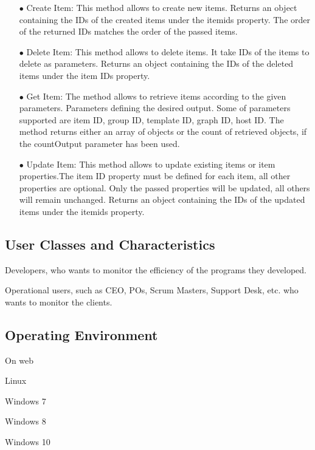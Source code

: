 \documentclass{article}
\begin{document}
\begin{itemize}
\item[$\bullet$]Create Item: This method allows to create new items. Returns an object containing the IDs of the created items under the itemids property. The order of the returned IDs matches the order of the passed items.

\item[$\bullet$]Delete Item: This method allows to delete items.  It take IDs of the items to delete as  parameters. Returns an object containing the IDs of the deleted items under the item IDs property.

\item[$\bullet$]Get Item: The method allows to retrieve items according to the given parameters. Parameters defining the desired output. Some of parameters supported are item ID, group ID, template ID, graph ID, host ID. The method returns either an array of objects or the count of retrieved objects, if the countOutput parameter has been used.

\item[$\bullet$]Update Item: This method allows to update existing items or item properties.The item ID property must be defined for each item, all other properties are optional. Only the passed properties will be updated, all others will remain unchanged. Returns an object containing the IDs of the updated items under the itemids property.

\end{itemize}

\subsection{User Classes and Characteristics}

\item[]Developers, who wants to monitor the efficiency of the programs they developed.
\item[]Operational users, such as CEO, POs, Scrum Masters, Support Desk, etc. who wants to monitor the clients.

\subsection{Operating Environment}

\item[]On web
\item[]Linux
\item[]Windows 7
\item[]Windows 8
\item[]Windows 10
\end{document}

